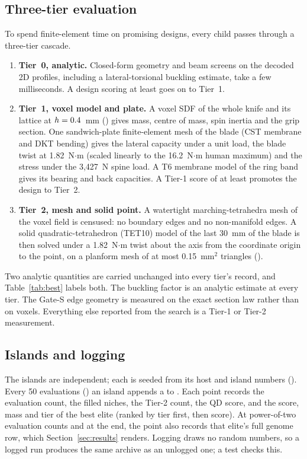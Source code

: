 \subsection{Three-tier evaluation}
To spend finite-element time on promising designs, every child passes through a three-tier cascade.
\begin{enumerate}
\item \textbf{Tier~0, analytic.} Closed-form geometry and beam screens on the decoded 2D profiles, including a
lateral-torsional buckling estimate, take a few milliseconds. A design scoring at least \gGateOne{} goes on to Tier~1.
\item \textbf{Tier~1, voxel model and plate.} A voxel SDF of the whole knife and its lattice at $h = 0.4$~mm
() gives mass, centre of mass, spin inertia and the grip section. One sandwich-plate finite-element
mesh of the blade (CST membrane and DKT bending) gives the lateral capacity under a unit load, the blade twist at
1.82~N$\cdot$m (scaled linearly to the 16.2~N$\cdot$m human maximum) and the stress under the 3,427~N spine load. A T6
membrane model of the ring band gives its bearing and back capacities. A Tier-1 score of at least \gGateTwo{} promotes
the design to Tier~2.
\item \textbf{Tier~2, mesh and solid point.} A watertight marching-tetrahedra mesh of the voxel field is censused: no
boundary edges and no non-manifold edges. A solid quadratic-tetrahedron (TET10) model of the last 30~mm of the blade
is then solved under a 1.82~N$\cdot$m twist about the axis from the coordinate origin to the point, on a planform mesh of at most 0.15~mm$^2$ triangles
().
\end{enumerate}
Two analytic quantities are carried unchanged into every tier's record, and Table~\ref{tab:best} labels both. The
buckling factor is an analytic estimate at every tier. The Gate-S edge geometry is measured on the exact section law
rather than on voxels. Everything else reported from the search is a Tier-1 or Tier-2 measurement.

\subsection{Islands and logging}
The islands are independent; each is seeded from its host and island numbers ().
Every 50 evaluations () an island appends a  to . Each
point records the evaluation count, the filled niches, the Tier-2 count, the QD score, and the score, mass and tier of
the best elite (ranked by tier first, then score). At power-of-two evaluation counts and at the end, the point also
records that elite's full genome row, which Section~\ref{sec:results} renders. Logging draws no random numbers, so a
logged run produces the same archive as an unlogged one; a test checks this.
